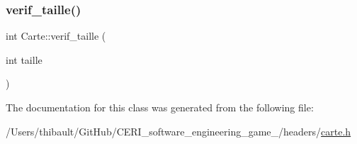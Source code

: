 \mbox{\label{class_carte_a49cb3378355966e82d28fd81fa84abd4}} 
\subsubsection{\texorpdfstring{verif\+\_\+taille()}{verif\_taille()}}
{\footnotesize\ttfamily int Carte\+::verif\+\_\+taille (\begin{DoxyParamCaption}\item[{int}]{taille }\end{DoxyParamCaption})}



The documentation for this class was generated from the following file\+:\begin{DoxyCompactItemize}
\item 
/\+Users/thibault/\+Git\+Hub/\+C\+E\+R\+I\+\_\+software\+\_\+engineering\+\_\+game\+\_/headers/\hyperlink{carte_8h}{carte.\+h}\end{DoxyCompactItemize}
